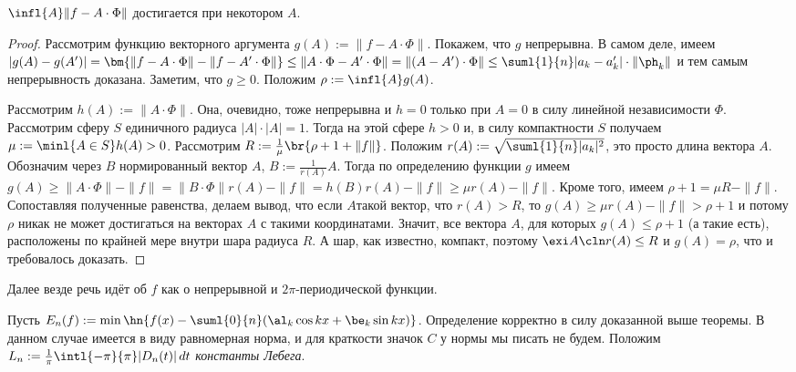 \documentclass[a4paper]{article}
\newcommand{\intlpp}{\intl{-\pi}{\pi}}
\newcommand{\frpi}{\frac{1}{\pi}}
\begin{document}
\begin{theorem}
$\infl{A} \|f-A\cdot \Phi\|$ достигается при некотором $A$.
\end{theorem}
\begin{proof}
Рассмотрим функцию векторного аргумента $g(A) := \|f-A\cdot \Phi\|$. Покажем, что $g$ непрерывна. В самом деле,
имеем $|g(A)-g(A')| = \bm{\|f-A\cdot \Phi\| - \|f - A'\cdot \Phi\|} \le \|A\cdot\Phi - A'\cdot\Phi\| = \|(A-A')\cdot\Phi\| \le \suml{1}{n}|a_k - a_k'|\cdot\|\ph_k\|$
и тем самым непрерывность доказана. Заметим, что $g \ge 0$. Положим $\rho := \infl{A} g(A)$.

Рассмотрим $h(A) := \|A\cdot \Phi\|$. Она, очевидно, тоже непрерывна и $h = 0$ только при $A = 0$ в силу линейной независимости $\Phi$.
Рассмотрим сферу $S$ единичного радиуса $|A|\cdot|A| = 1$. Тогда на этой сфере $h > 0$ и, в силу компактности $S$ получаем $\mu := \minl{A \in S} h(A) > 0$.
Рассмотрим $R := \frac{1}{\mu}\br{\rho + 1 + \|f\|}$. Положим $r(A) := \sqrt{\suml{1}{n}|a_k|^2}$,  это просто длина вектора $A$.
Обозначим через $B$ нормированный вектор $A$,  $B := \frac{1}{r(A)}A$. Тогда по определению функции $g$ имеем
$g(A) \ge \|A\cdot\Phi\| - \|f\| = \|B\cdot\Phi\| r(A) - \|f\| = h(B)r(A) - \|f\| \ge \mu r(A) - \|f\|$. Кроме того,
имеем $\rho + 1 = \mu R - \|f\|$. Сопоставляя полученные равенства, делаем вывод, что если $A$\т такой вектор, что $r(A) > R$, то
$g(A) \ge \mu r(A) - \|f\| > \rho + 1$ и потому $\rho$ никак не может достигаться на векторах $A$ с такими координатами. Значит,
все вектора $A$, для которых $g(A) \le \rho + 1$ (а такие есть), расположены по крайней мере внутри шара радиуса $R$. А шар, как известно, компакт,
поэтому $\exi A\cln r(A) \le R$ и $g(A) = \rho$, что и требовалось доказать.
\end{proof}

\begin{note}
Далее везде речь идёт об $f$ как о непрерывной и $2\pi$-периодической функции.
\end{note}

Пусть $E_n(f) := \min \hn{f(x) - \suml{0}{n}(\al_k\cos kx + \be_k \sin kx)}$. Определение корректно
в силу доказанной выше теоремы. В данном случае имеется в виду равномерная норма, и для краткости
значок $C$ у нормы мы писать не будем. Положим $L_n := \frpi \intlpp|D_n(t)|\,d t$\т
\emph{константы Лебега}.
\end{document}
